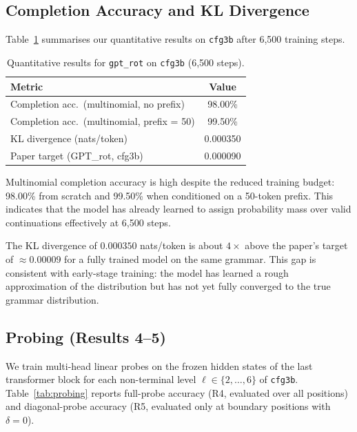 \documentclass[10pt,twocolumn]{article}
\begin{document}
\subsection{Completion Accuracy and KL Divergence}

Table~\ref{tab:main} summarises our quantitative results on \texttt{cfg3b} after 6{,}500 training steps.

\begin{table}[h]
\centering
\caption{Quantitative results for \texttt{gpt\_rot} on \texttt{cfg3b} (6{,}500 steps).}
\label{tab:main}
\small
\begin{tabular}{lc}
\toprule
\textbf{Metric} & \textbf{Value} \\
\midrule
Completion acc.\ (multinomial, no prefix)   & 98.00\% \\
Completion acc.\ (multinomial, prefix = 50) & 99.50\% \\
\midrule
KL divergence (nats/token)                  & 0.000350 \\
\quad Paper target (GPT\_rot, cfg3b)        & 0.000090 \\
\bottomrule
\end{tabular}
\end{table}

Multinomial completion accuracy is high despite the reduced training budget: 98.00\% from scratch and 99.50\% when conditioned on a 50-token prefix. This indicates that the model has already learned to assign probability mass over valid continuations effectively at 6{,}500 steps.

The KL divergence of $0.000350$ nats/token is about $4\times$ above the paper's target of ${\approx}0.00009$ for a fully trained model on the same grammar. This gap is consistent with early-stage training: the model has learned a rough approximation of the distribution but has not yet fully converged to the true grammar distribution.

\subsection{Probing (Results 4--5)}

We train multi-head linear probes on the frozen hidden states of the last transformer block for each non-terminal level $\ell \in \{2,\ldots,6\}$ of \texttt{cfg3b}. Table~\ref{tab:probing} reports full-probe accuracy (R4, evaluated over all positions) and diagonal-probe accuracy (R5, evaluated only at boundary positions with $\delta=0$).
\end{document}
